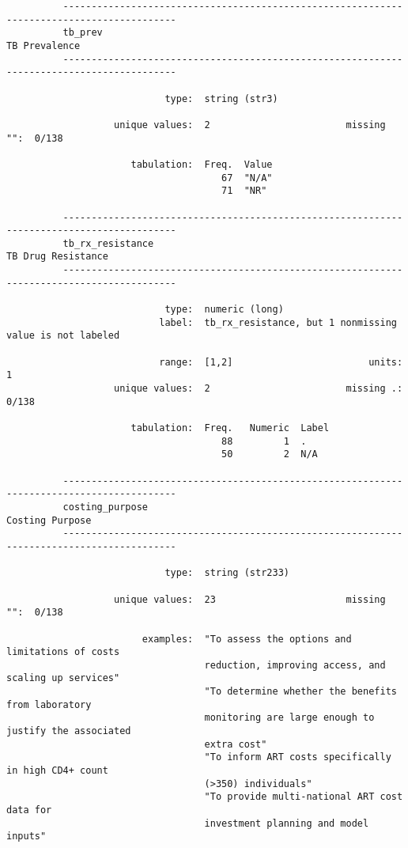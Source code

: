 \documentclass{article}
\begin{document}
\begin{verbatim}
          ------------------------------------------------------------------------------------------
          tb_prev                                                                      TB Prevalence
          ------------------------------------------------------------------------------------------
          
                            type:  string (str3)
          
                   unique values:  2                        missing "":  0/138
          
                      tabulation:  Freq.  Value
                                      67  "N/A"
                                      71  "NR"
          
          ------------------------------------------------------------------------------------------
          tb_rx_resistance                                                        TB Drug Resistance
          ------------------------------------------------------------------------------------------
          
                            type:  numeric (long)
                           label:  tb_rx_resistance, but 1 nonmissing value is not labeled
          
                           range:  [1,2]                        units:  1
                   unique values:  2                        missing .:  0/138
          
                      tabulation:  Freq.   Numeric  Label
                                      88         1  .
                                      50         2  N/A
          
          ------------------------------------------------------------------------------------------
          costing_purpose                                                            Costing Purpose
          ------------------------------------------------------------------------------------------
          
                            type:  string (str233)
          
                   unique values:  23                       missing "":  0/138
          
                        examples:  "To assess the options and limitations of costs
                                   reduction, improving access, and scaling up services"
                                   "To determine whether the benefits from laboratory
                                   monitoring are large enough to justify the associated
                                   extra cost"
                                   "To inform ART costs specifically in high CD4+ count
                                   (>350) individuals"
                                   "To provide multi-national ART cost data for
                                   investment planning and model inputs"
          

\end{verbatim}
\end{document}

